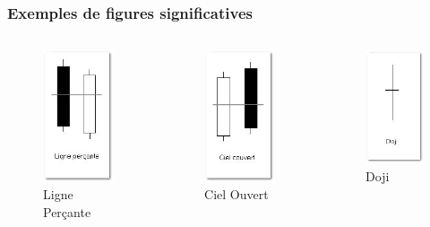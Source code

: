 \begin{frame}
    \frametitle{Exemples de figures significatives}
       	\begin{columns}
		\begin{column}{3.5cm}
		  \begin{figure}
		      \includegraphics[scale=0.45]{images/chandelier1.png}
		      \caption{Ligne Perçante}		   
		  \end{figure}
		\end{column}
		\begin{column}{3.5cm}
		  \begin{figure}
		      \includegraphics[scale=0.45]{images/chandelier2.png}
		      \caption{Ciel Ouvert}	   
		  \end{figure}
		\end{column}
		\begin{column}{3.5cm}
		  \begin{figure}
		      \includegraphics[scale=0.49]{images/chandelier9.png}
		      \caption{Doji}	   
		  \end{figure}
		\end{column}		
	\end{columns}

\end{frame}

